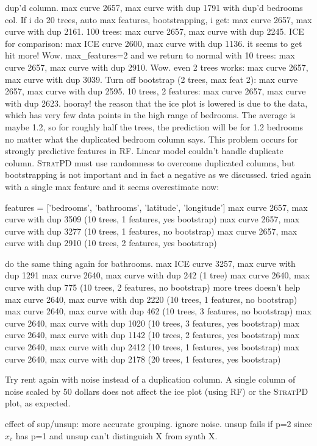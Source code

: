\documentclass[12pt]{article}
\newcommand{\spd}{\fontfamily{cmr}\textsc{\small StratPD}}
\newcommand{\xnc}{$x_{\overline{c}}$}
\begin{document}
dup'd column. max curve 2657, max curve with dup 1791 with dup'd bedrooms col.  If i do 20 trees, auto max features, bootstrapping, i get: max curve 2657, max curve with dup 2161. 100 trees: max curve 2657, max curve with dup 2245. ICE for comparison: max ICE curve 2600, max curve with dup 1136. it seems to get hit more! Wow. max\_features=2 and we return to normal with 10 trees: max curve 2657, max curve with dup 2910. Wow. even 2 trees works: max curve 2657, max curve with dup 3039. Turn off bootstrap (2 trees, max feat 2): max curve 2657, max curve with dup 2595. 10 trees, 2 features: max curve 2657, max curve with dup 2623. hooray!  the reason that the ice plot is lowered is due to the data, which has very few data points in the high range of bedrooms. The average is maybe 1.2, so for roughly half the trees, the prediction will be for 1.2 bedrooms no matter what the duplicated bedroom column says.  This problem occurs for strongly predictive features in RF. Linear model couldn't handle duplicate column. \spd{} must use randomness to overcome duplicated columns, but bootstrapping is not important and in fact a negative as we discussed.   tried again with a single max feature and it seems overestimate now:

features = ['bedrooms', 'bathrooms', 'latitude', 'longitude']
max curve 2657, max curve with dup 3509 (10 trees, 1 features, yes bootstrap)
max curve 2657, max curve with dup 3277 (10 trees, 1 features, no bootstrap)
max curve 2657, max curve with dup 2910 (10 trees, 2 features, yes bootstrap)

do the same thing again for bathrooms.
max ICE curve 3257, max curve with dup 1291
max curve 2640, max curve with dup 242 (1 tree)
max curve 2640, max curve with dup 775 (10 trees, 2 features, no bootstrap) more trees doesn't help
max curve 2640, max curve with dup 2220 (10 trees, 1 features, no bootstrap)
max curve 2640, max curve with dup 462 (10 trees, 3 features, no bootstrap)
max curve 2640, max curve with dup 1020 (10 trees, 3 features, yes bootstrap)
max curve 2640, max curve with dup 1142 (10 trees, 2 features, yes bootstrap)
max curve 2640, max curve with dup 2412 (10 trees, 1 features, yes bootstrap)
max curve 2640, max curve with dup 2178 (20 trees, 1 features, yes bootstrap)

Try rent again with noise instead of a duplication column. A single column of noise scaled by 50 dollars does not affect the ice plot (using RF) or the \spd{} plot, as expected.

effect of sup/unsup: more accurate grouping. ignore noise. unsup fails if p=2 since \xnc{} has p=1 and unsup can't distinguish X from synth X.
\end{document}
